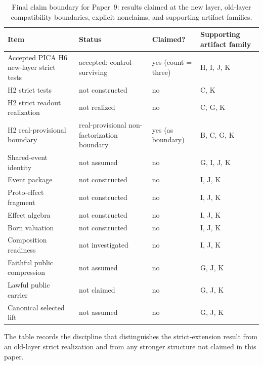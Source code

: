 \documentclass[11pt]{article}
\newcommand{\OldLayer}{H2}
\newcommand{\NewLayer}{H6}
\newcommand{\PaperNine}{Paper~9}
\newcommand{\AcceptedTestCount}{three}
\newcommand{\OldLayerStatus}{real-provisional non-factorization boundary}
\theoremstyle{definition}
\begin{document}
\begin{table}[tbp]
  \centering
  \caption{Final claim boundary for \PaperNine{}: results claimed at the new layer, old-layer compatibility boundaries, explicit nonclaims, and supporting artifact families.}
  \label{tab:final-claim-boundary}
  \small
  \begin{tabularx}{\textwidth}{@{}>{\raggedright\arraybackslash}X>{\raggedright\arraybackslash}X>{\raggedright\arraybackslash}p{}>{\raggedright\arraybackslash}p{}@{}}
    \toprule
    Item & Status & Claimed? & Supporting artifact family \\
    \midrule
    Accepted PICA \NewLayer{} new-layer strict tests
      & accepted; control-surviving
      & yes (count = \AcceptedTestCount)
      & H, I, J, K \\
    \OldLayer{} strict tests
      & not constructed
      & no
      & C, K \\
    \OldLayer{} strict readout realization
      & not realized
      & no
      & C, G, K \\
    \OldLayer{} real-provisional boundary
      & \OldLayerStatus{}
      & yes (as boundary)
      & B, C, G, K \\
    Shared-event identity
      & not assumed
      & no
      & G, I, J, K \\
    Event package
      & not constructed
      & no
      & I, J, K \\
    Proto-effect fragment
      & not constructed
      & no
      & I, J, K \\
    Effect algebra
      & not constructed
      & no
      & I, J, K \\
    Born valuation
      & not constructed
      & no
      & I, J, K \\
    Composition readiness
      & not investigated
      & no
      & I, J, K \\
    Faithful public compression
      & not assumed
      & no
      & G, J, K \\
    Lawful public carrier
      & not claimed
      & no
      & G, J, K \\
    Canonical selected lift
      & not assumed
      & no
      & G, J, K \\
    \bottomrule
  \end{tabularx}
\end{table}
 
The table records the discipline that distinguishes the strict-extension result
from an old-layer strict realization and from any stronger structure not claimed
in this paper.
\end{document}
